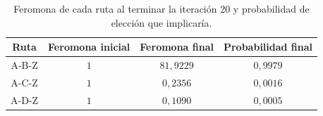 \begin{table}[H]
\centering
\small
\setlength{\tabcolsep}{6pt}
\renewcommand{\arraystretch}{1.15}
\begin{tabular}{|c|c|c|c|}
\hline
\rowcolor{encabezado}\textbf{Ruta} & \textbf{Feromona inicial} & \textbf{Feromona final} & \textbf{Probabilidad final} \\
\hline
A-B-Z & $1$ & $81{,}9229$ & $0{,}9979$ \\
\hline
A-C-Z & $1$ & $0{,}2356$ & $0{,}0016$ \\
\hline
A-D-Z & $1$ & $0{,}1090$ & $0{,}0005$ \\
\hline
\end{tabular}
\caption{Feromona de cada ruta al terminar la iteración 20 y probabilidad de elección que implicaría.}
\label{tab:p4b-feromonas}
\end{table}
